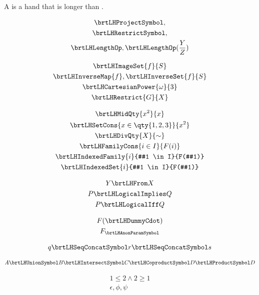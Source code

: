 \documentclass{article}
\begin{document}
    A  is a hand that is longer than
    .

    \begin{gather}
        \brtLHProjectSymbol ,
        \\
        \brtLHRestrictSymbol ,
        \\
        \brtLHLengthOp ,
        \brtLHLengthOp(\frac Y Z)
    \end{gather}

    \begin{gather}
        \brtLHImageSet {f} {S}
        \\
        \brtLHInverseMap {f} ,
        \brtLHInverseSet {f} {S}
        \\
        \brtLHCartesianPower {\omega} {3}
        \\
        \brtLHRestrict {G} {X}
    \end{gather}

    \begin{gather}
        \brtLHMidQty {x^2} {x}
        \\
        \brtLHSetCons {x \in \qty{1,2,3}} {x^2}
        \\
        \brtLHDivQty {X} {\sim}
        \\
        \brtLHFamilyCons {i \in I} {F(i)}
        \\
        \brtLHIndexedFamily {i} {#1 \in I} {F(#1)}
        \\
        \brtLHIndexedSet {i} {#1 \in I} {F(#1)}
    \end{gather}

    \begin{gather}
        Y \brtLHFrom X
        \\
        P \brtLHLogicalImplies Q
        \\
        P \brtLHLogicalIff Q
    \end{gather}

    \begin{gather}
        F(\brtLHDummyCdot)
        \\
        F_{\brtLHAnonParamSymbol}
    \end{gather}

    \begin{gather}
        q
        \brtLHSeqConcatSymbol
        r
        \brtLHSeqConcatSymbol
        s
    \end{gather}

    \begin{gather}
        A
        \brtLHUnionSymbol B
        \brtLHIntersectSymbol C
        \brtLHCoproductSymbol D
        \brtLHProductSymbol D
    \end{gather}

    \begin{gather}
        1 \leq 2 \land
        2 \geq 1
        \\
        \epsilon
        , \phi
        , \psi
    \end{gather}
\end{document}
